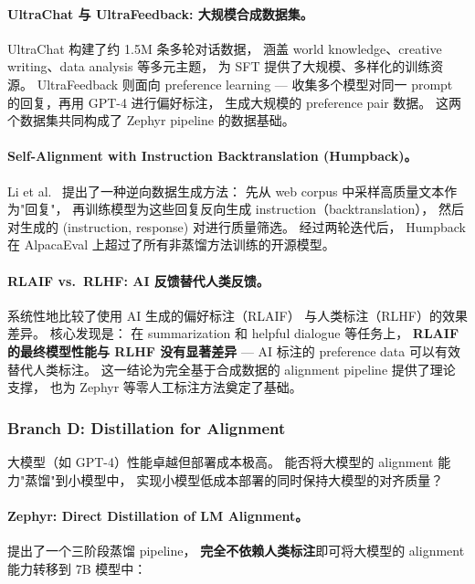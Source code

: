 \paragraph{UltraChat 与 UltraFeedback: 大规模合成数据集。}
UltraChat \cite{ding2023ultrachat} 构建了约 1.5M 条多轮对话数据，
涵盖 world knowledge、creative writing、data analysis 等多元主题，
为 SFT 提供了大规模、多样化的训练资源。
UltraFeedback \cite{cui2023ultrafeedback} 则面向 preference learning ---
收集多个模型对同一 prompt 的回复，再用 GPT-4 进行偏好标注，
生成大规模的 preference pair 数据。
这两个数据集共同构成了 Zephyr \cite{tunstall2023zephyr} pipeline 的数据基础。

\paragraph{Self-Alignment with Instruction Backtranslation (Humpback)。}
Li et al.\ \cite{li2023humpback} 提出了一种逆向数据生成方法：
先从 web corpus 中采样高质量文本作为"回复"，
再训练模型为这些回复反向生成 instruction（backtranslation），
然后对生成的 (instruction, response) 对进行质量筛选。
经过两轮迭代后，
Humpback 在 AlpacaEval 上超过了所有非蒸馏方法训练的开源模型。

\paragraph{RLAIF vs.\ RLHF: AI 反馈替代人类反馈。}
 系统性地比较了使用 AI 生成的偏好标注（RLAIF）
与人类标注（RLHF）的效果差异。
核心发现是：
在 summarization 和 helpful dialogue 等任务上，
\textbf{RLAIF 的最终模型性能与 RLHF 没有显著差异} ---
AI 标注的 preference data 可以有效替代人类标注。
这一结论为完全基于合成数据的 alignment pipeline 提供了理论支撑，
也为 Zephyr 等零人工标注方法奠定了基础。

\subsubsection{Branch D: Distillation for Alignment}
\label{sec:t7-distillation}

\begin{problembox}
大模型（如 GPT-4）性能卓越但部署成本极高。
能否将大模型的 alignment 能力"蒸馏"到小模型中，
实现小模型低成本部署的同时保持大模型的对齐质量？
\end{problembox}

\paragraph{Zephyr: Direct Distillation of LM Alignment。}
 提出了一个三阶段蒸馏 pipeline，
\textbf{完全不依赖人类标注}即可将大模型的 alignment 能力转移到 7B 模型中：

